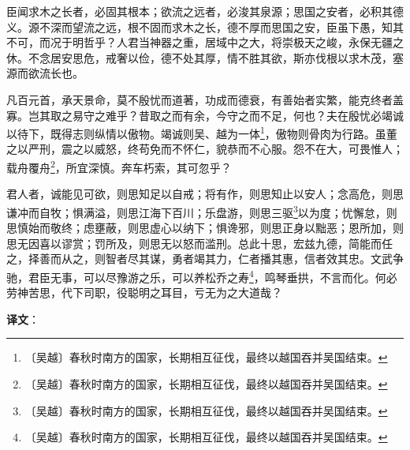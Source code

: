 \documentclass[12pt,UTF-8,openany]{ctexbook}
\begin{document}
\begin{normalsize}
    
    臣闻求木之长者，必固其根本；欲流之远者，必浚其泉源；思国之安者，必积其德义。源不深而望流之远，根不固而求木之长，德不厚而思国之安，臣虽下愚，知其不可，而况于明哲乎？人君当神器之重，居域中之大，将崇极天之峻，永保无疆之休。不念居安思危，戒奢以俭，德不处其厚，情不胜其欲，斯亦伐根以求木茂，塞源而欲流长也。
    
    凡百元首，承天景命，莫不殷忧而道著，功成而德衰，有善始者实繁，能克终者盖寡。岂其取之易守之难乎？昔取之而有余，今守之而不足，何也？夫在殷忧必竭诚以待下，既得志则纵情以傲物。竭诚则吴、越为一体\footnote{〔吴越〕春秋时南方的国家，长期相互征伐，最终以越国吞并吴国结束。}，傲物则骨肉为行路。虽董之以严刑，震之以威怒，终苟免而不怀仁，貌恭而不心服。怨不在大，可畏惟人；载舟覆舟\footnote{〔吴越〕春秋时南方的国家，长期相互征伐，最终以越国吞并吴国结束。}，所宜深慎。奔车朽索，其可忽乎？
    
    君人者，诚能见可欲，则思知足以自戒；将有作，则思知止以安人；念高危，则思谦冲而自牧；惧满溢，则思江海下百川；乐盘游，则思三驱\footnote{〔吴越〕春秋时南方的国家，长期相互征伐，最终以越国吞并吴国结束。}以为度；忧懈怠，则思慎始而敬终；虑壅蔽，则思虚心以纳下；惧谗邪，则思正身以黜恶；恩所加，则思无因喜以谬赏；罚所及，则思无以怒而滥刑。总此十思，宏兹九德，简能而任之，择善而从之，则智者尽其谋，勇者竭其力，仁者播其惠，信者效其忠。文武争驰，君臣无事，可以尽豫游之乐，可以养松乔之寿\footnote{〔吴越〕春秋时南方的国家，长期相互征伐，最终以越国吞并吴国结束。}，鸣琴垂拱，不言而化。何必劳神苦思，代下司职，役聪明之耳目，亏无为之大道哉？
\end{normalsize}


\newpage

\textbf{译文}：

\vspace{1em}
\end{document}
